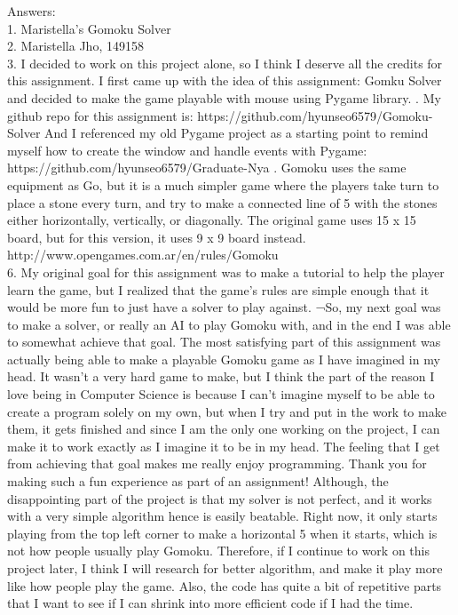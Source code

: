 \documentclass[a4paper]{article}
\begin{document}
\noindent Answers:\\
1.	Maristella’s Gomoku Solver\\
2.	Maristella Jho, 149158\\
3.	I decided to work on this project alone, so I think I deserve all the credits for this assignment. I first came up with the idea of this assignment: Gomku Solver and decided to make the game playable with mouse using Pygame library.
.	My github repo for this assignment is: https://github.com/hyunseo6579/Gomoku-Solver
And I referenced my old Pygame project as a starting point to remind myself how to create the window and handle events with Pygame: https://github.com/hyunseo6579/Graduate-Nya
.	Gomoku uses the same equipment as Go, but it is a much simpler game where the players take turn to place a stone every turn, and try to make a connected line of 5 with the stones either horizontally, vertically, or diagonally. The original game uses 15 x 15 board, but for this version, it uses 9 x 9 board instead.
http://www.opengames.com.ar/en/rules/Gomoku
\newline \\
6.	My original goal for this assignment was to make a tutorial to help the player learn the game, but I realized that the game’s rules are simple enough that it would be more fun to just have a solver to play against. ¬So, my next goal was to make a solver, or really an AI to play Gomoku with, and in the end I was able to somewhat achieve that goal. The most satisfying part of this assignment was actually being able to make a playable Gomoku game as I have imagined in my head. It wasn’t a very hard game to make, but I think the part of the reason I love being in Computer Science is because I can’t imagine myself to be able to create a program solely on my own, but when I try and put in the work to make them, it gets finished and since I am the only one working on the project, I can make it to work exactly as I imagine it to be in my head. The feeling that I get from achieving that goal makes me really enjoy programming. Thank you for making such a fun experience as part of an assignment! Although, the disappointing part of the project is that my solver is not perfect, and it works with a very simple algorithm hence is easily beatable. Right now, it only starts playing from the top left corner to make a horizontal 5 when it starts, which is not how people usually play Gomoku. Therefore, if I continue to work on this project later, I think I will research for better algorithm, and make it play more like how people play the game. Also, the code has quite a bit of repetitive parts that I want to see if I can shrink into more efficient code if I had the time.
\end{document}
